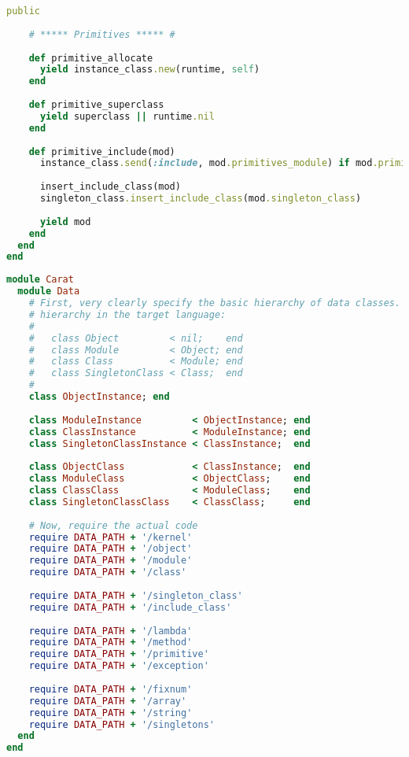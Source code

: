 \begin{lstlisting}[title={\small\ttfamily\bfseries data/class.rb},language=Ruby]
    public
    
    # ***** Primitives ***** #
    
    def primitive_allocate
      yield instance_class.new(runtime, self)
    end
    
    def primitive_superclass
      yield superclass || runtime.nil
    end
    
    def primitive_include(mod)
      instance_class.send(:include, mod.primitives_module) if mod.primitives_module
      
      insert_include_class(mod)
      singleton_class.insert_include_class(mod.singleton_class)
      
      yield mod
    end
  end
end

\end{lstlisting}
\begin{lstlisting}[title={\small\ttfamily\bfseries data/data.rb},language=Ruby]
module Carat
  module Data
    # First, very clearly specify the basic hierarchy of data classes. This mirrors the inheritance
    # hierarchy in the target language:
    # 
    #   class Object         < nil;    end
    #   class Module         < Object; end
    #   class Class          < Module; end
    #   class SingletonClass < Class;  end
    # 
    class ObjectInstance; end
    
    class ModuleInstance         < ObjectInstance; end
    class ClassInstance          < ModuleInstance; end
    class SingletonClassInstance < ClassInstance;  end
    
    class ObjectClass            < ClassInstance;  end
    class ModuleClass            < ObjectClass;    end
    class ClassClass             < ModuleClass;    end
    class SingletonClassClass    < ClassClass;     end
    
    # Now, require the actual code
    require DATA_PATH + '/kernel'
    require DATA_PATH + '/object'
    require DATA_PATH + '/module'
    require DATA_PATH + '/class'
    
    require DATA_PATH + '/singleton_class'
    require DATA_PATH + '/include_class'
    
    require DATA_PATH + '/lambda'
    require DATA_PATH + '/method'
    require DATA_PATH + '/primitive'
    require DATA_PATH + '/exception'
    
    require DATA_PATH + '/fixnum'
    require DATA_PATH + '/array'
    require DATA_PATH + '/string'
    require DATA_PATH + '/singletons'
  end
end

\end{lstlisting}
